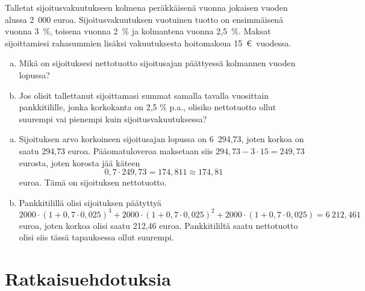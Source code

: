 \documentclass{article}\usepackage[]{graphicx}\usepackage[]{color}
\begin{document}
\begin{question} 
    Talletat sijoitusvakuutukseen kolmena peräkkäisenä vuonna jokaisen vuoden alussa 2~000 euroa. Sijoitusvakuutuksen vuotuinen tuotto on ensimmäisenä vuonna 3~\%, toisena vuonna 2~\% ja kolmantena vuonna 2{,}5~\%. Maksat sijoittamiesi rahasummien lisäksi vakuutuksesta hoitomaksua 15~\euro\ vuodessa. 
    \begin{enumerate}[(a)]
        \item Mikä on sijoituksesi nettotuotto sijoitusajan päättyessä kolmannen vuoden lopussa? 
        \item Jos olisit tallettanut sijoittamasi summat samalla tavalla vuosittain pankkitilille, jonka korkokanta on 2{,}5 \% p.a., olisiko nettotuotto ollut suurempi vai pienempi kuin sijoitusvakuutuksessa?
    \end{enumerate}
\end{question}
\begin{solution}

    \begin{enumerate}[(a)]
        \item Sijoituksen arvo korkoineen sijoitusajan lopussa on 6~294{,}73, joten korkoa on saatu 294{,}73 euroa. Pääomatuloveroa maksetaan siis \(294{,}73 - 3\cdot15 = 249{,}73\) eurosta, joten korosta jää käteen 
        \[
           0,7\cdot249{,}73 = 174{,}811 \approx 174{,}81
        \]
        euroa. Tämä on sijoituksen nettotuotto.
        \item Pankkitilillä olisi sijoituksen päätyttyä
        \[
            2000\cdot(1+0,7\cdot0,025)^3 + 2000\cdot(1+0,7\cdot0,025)^2+ 2000\cdot(1+0,7\cdot0,025) = 6~212{,}461
        \]
        euroa, joten korkoa olisi saatu 212{,}46 euroa. Pankkitililtä saatu nettotuotto olisi siis tässä tapauksessa ollut suurempi.
    \end{enumerate}
\end{solution}

\section*{Ratkaisuehdotuksia}

\printsolutions
\end{document}
